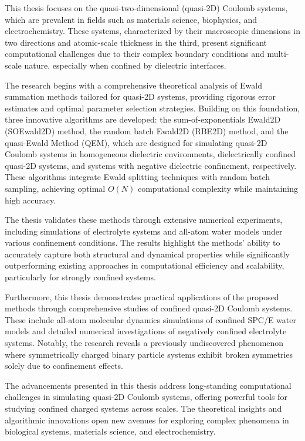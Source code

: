 This thesis focuses on the quasi-two-dimensional (quasi-2D) Coulomb systems, which are prevalent in fields such as materials science, biophysics, and electrochemistry. 
These systems, characterized by their macroscopic dimensions in two directions and atomic-scale thickness in the third, present significant computational challenges due to their complex boundary conditions and multi-scale nature, especially when confined by dielectric interfaces.

The research begins with a comprehensive theoretical analysis of Ewald summation methods tailored for quasi-2D systems, providing rigorous error estimates and optimal parameter selection strategies. 
Building on this foundation, three innovative algorithms are developed: the sum-of-exponentials Ewald2D (SOEwald2D) method, the random batch Ewald2D (RBE2D) method, and the quasi-Ewald Method (QEM), which are designed for simulating quasi-2D Coulomb systems in homogeneous dielectric environments, dielectrically confined quasi-2D systems, and systems with negative dielectric confinement, respectively.
These algorithms integrate Ewald splitting techniques with random batch sampling, achieving optimal $O(N)$ computational complexity while maintaining high accuracy. 

The thesis validates these methods through extensive numerical experiments, including simulations of electrolyte systems and all-atom water models under various confinement conditions. 
The results highlight the methods' ability to accurately capture both structural and dynamical properties while significantly outperforming existing approaches in computational efficiency and scalability, particularly for strongly confined systems.

Furthermore, this thesis demonstrates practical applications of the proposed methods through comprehensive studies of confined quasi-2D Coulomb systems. 
These include all-atom molecular dynamics simulations of confined SPC/E water models and detailed numerical investigations of negatively confined electrolyte systems. 
Notably, the research reveals a previously undiscovered phenomenon where symmetrically charged binary particle systems exhibit broken symmetries solely due to confinement effects.

The advancements presented in this thesis address long-standing computational challenges in simulating quasi-2D Coulomb systems, offering powerful tools for studying confined charged systems across scales. 
The theoretical insights and algorithmic innovations open new avenues for exploring complex phenomena in biological systems, materials science, and electrochemistry.